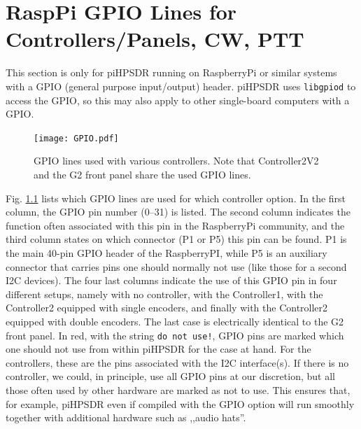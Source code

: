 \documentclass[12pt]{book}
\def\rett#1{\texttt{\color{red}#1}}
\def\pH{pi\-HPSDR\xspace}
\begin{document}
\begin{itemize}

\end{itemize}
\chapter[RaspPi GPIO lines]{RaspPi GPIO Lines for Controllers/Panels, CW, PTT}
\label{sec:gpio}
This section is only for \pH running on RaspberryPi or similar systems with a GPIO (general purpose
input/output) header. \pH uses \texttt{libgpiod} to access the GPIO, so this may also apply to
other single-board computers with a GPIO.

\begin{figure}[ht!]
\center
\texttt{[image: GPIO.pdf]}
\caption{GPIO lines used with various controllers. Note that Controller2V2 and the G2 front panel
share the used GPIO lines.}
\label{fig:GPIO}
\end{figure}

Fig. \ref{fig:GPIO} lists which GPIO lines are used for which controller option. In the first column,
the GPIO pin number (0--31) is listed. The second column indicates the function often
associated with this pin in the RaspberryPi community, and the third column states on which connector
(P1 or P5) this pin can be found. P1 is the main 40-pin GPIO header of the RaspberryPI, while P5 is
an auxiliary connector that carries pins one should normally not use (like those for a second I2C
devices). The four last columns indicate the use of this GPIO pin in four different setups, namely
with no controller, with the Controller1, with the Controller2 equipped with single encoders, and
finally with the Controller2 equipped with double encoders. The last case is electrically identical to
the G2 front panel. In red, with the string \texttt{do not use!}, GPIO pins are marked which one should
not use from within \pH for the case at hand. For the controllers, these are the pins associated
with the I2C interface(s). If there is no controller, we could, in principle, use all GPIO pins at our
discretion, but all those often used by other hardware are marked as not to use. This ensures that,
for example, \pH even if compiled with the GPIO option will run smoothly together with additional
hardware such as ,,audio hats''.
\end{document}
